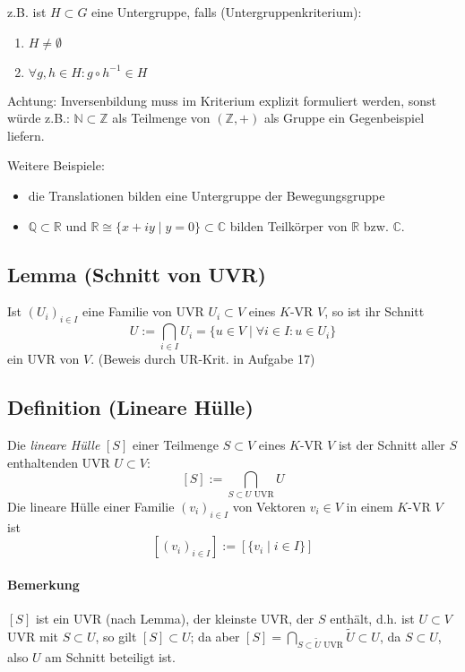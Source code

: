         z.B. ist $H\subset G$ eine Untergruppe, falls (Untergruppenkriterium):
        \begin{enumerate}
            \item $H\neq \emptyset$
            \item $\forall g,h\in H: g\circ h^{-1} \in H$
        \end{enumerate}
        
	Achtung: Inversenbildung muss im Kriterium explizit formuliert werden, sonst würde z.B.: $\mathbb{N}\subset\mathbb{Z}$ als Teilmenge von $(\mathbb{Z}, +)$ als Gruppe ein Gegenbeispiel liefern.
        
        Weitere Beispiele:
        \begin{itemize}
            \item die Translationen bilden eine Untergruppe der Bewegungsgruppe
            \item $\mathbb{Q}\subset\mathbb{R}$ und $\mathbb{R}\cong \{x+iy\mid y=0\}\subset\mathbb{C}$ bilden Teilkörper von $\mathbb{R}$ bzw. $\mathbb{C}$.
        \end{itemize}

\subsection{Lemma (Schnitt von UVR)}
    \begin{Lemma}
    	Ist $(U_i)_{i\in I}$ eine Familie von UVR $U_i\subset V$ eines $K$-VR $V$, so ist ihr Schnitt
        \[ U:= \bigcap_{i\in I}U_i =\{ u\in V\mid \forall i\in I: u\in U_i\} \]
	ein UVR von $V$. (Beweis durch UR-Krit. in Aufgabe 17)
    \end{Lemma}
    
\subsection{Definition (Lineare Hülle)}
	\begin{Definition}
		Die \emph{lineare Hülle} $[S]$ einer Teilmenge $S\subset V$ eines $ K $-VR $ V $ ist der Schnitt aller $S$ enthaltenden UVR $U\subset V$:
		\[ [S] := \bigcap_{S\subset U \text{ UVR}} U \]
	Die lineare Hülle einer Familie $(v_i)_{i\in I}$ von Vektoren $v_i\in V$ in einem $ K $-VR $ V $ ist
		\[ [(v_i)_{i\in I}] := [\{v_i\mid i\in I\}] \]
	\end{Definition}

\paragraph{Bemerkung}
    $[S]$ ist ein UVR (nach Lemma), der \glqq kleinste\grqq{} UVR, der $S$ enthält, d.h. ist $U\subset V$ UVR mit $S\subset U$, so gilt $[S]\subset U$; da aber $[S] = \bigcap_{S\subset \tilde{U}  \text{ UVR}}\tilde{U}\subset U$,
    da $S\subset U$, also $U$ am Schnitt beteiligt ist.

